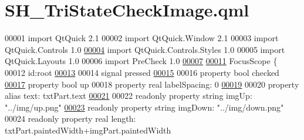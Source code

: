\hypertarget{SH__TriStateCheckImage_8qml}{\section{S\-H\-\_\-\-Tri\-State\-Check\-Image.\-qml}
\label{SH__TriStateCheckImage_8qml}
}

\begin{DoxyCode}
00001 \textcolor{keyword}{import} QtQuick 2.1
00002 import QtQuick.Window 2.1
00003 import QtQuick.Controls 1.0
\hypertarget{SH__TriStateCheckImage_8qml_source_l00004}{}\hyperlink{classSH__TriStateCheckImage}{00004} import QtQuick.Controls.Styles 1.0
00005 import QtQuick.Layouts 1.0
00006 import PreCheck 1.0
\hypertarget{SH__TriStateCheckImage_8qml_source_l00007}{}\hyperlink{classSH__TriStateCheckImage_af51c5a98710ecd059fd02bd955443d4c}{00007} 
\hypertarget{SH__TriStateCheckImage_8qml_source_l00011}{}\hyperlink{classSH__TriStateCheckImage_afb0d31a1bf26dffbb2a186c82ab8e58d}{00011} FocusScope \{
00012     \textcolor{keywordtype}{id}:root
\hypertarget{SH__TriStateCheckImage_8qml_source_l00013}{}\hyperlink{classSH__TriStateCheckImage_af1e4845c499b61447425538898cf9dbb}{00013} 
00014     signal pressed
\hypertarget{SH__TriStateCheckImage_8qml_source_l00015}{}\hyperlink{classSH__TriStateCheckImage_a94f6100793509e72d00079b4566a74f8}{00015} 
00016     \textcolor{keyword}{property} \textcolor{keywordtype}{bool} checked
\hypertarget{SH__TriStateCheckImage_8qml_source_l00017}{}\hyperlink{classSH__TriStateCheckImage_a1dd7b1fbd15c10d427d72a9bd0d1e4d5}{00017}     \textcolor{keyword}{property} \textcolor{keywordtype}{bool} up
00018     \textcolor{keyword}{property} real labelSpacing: 0
\hypertarget{SH__TriStateCheckImage_8qml_source_l00019}{}\hyperlink{classSH__TriStateCheckImage_aa4fa21a8c9124188a7ea87b4a922c617}{00019} 
00020     \textcolor{keyword}{property} alias text: txtPart.text
\hypertarget{SH__TriStateCheckImage_8qml_source_l00021}{}\hyperlink{classSH__TriStateCheckImage_a4adf1659a5328f5e26243cd58f1d6ee7}{00021} 
00022     readonly \textcolor{keyword}{property} \textcolor{keywordtype}{string} imgUp: \textcolor{stringliteral}{"../img/up.png"}
\hypertarget{SH__TriStateCheckImage_8qml_source_l00023}{}\hyperlink{classSH__TriStateCheckImage_a34d45a4093bca7a689f72b1e9f4d8247}{00023}     readonly \textcolor{keyword}{property} \textcolor{keywordtype}{string} imgDown: \textcolor{stringliteral}{"../img/down.png"}
00024     readonly \textcolor{keyword}{property} real length: txtPart.paintedWidth+imgPart.paintedWidth

\end{DoxyCode}
